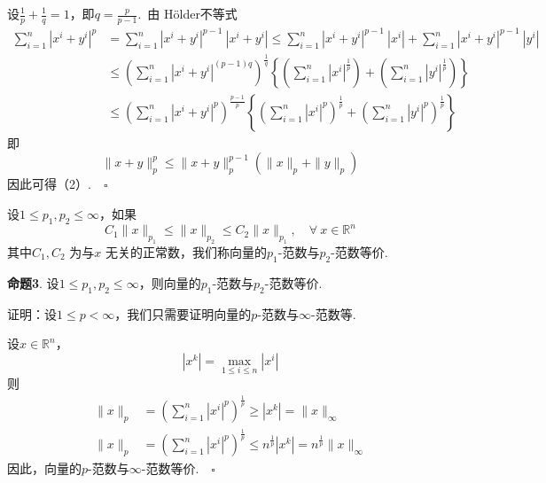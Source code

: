 \documentclass{article}
\begin{document}
\vspace{10pt}

\noindent 设\(\frac{1}{p} + \frac{1}{q} = 1\)，即\(q = \frac{p}{p - 1} \).\ 由 H\"older不等式
\begin{align*}
    \sum_{i=1}^n | x^i + y^i |^p &= \sum_{i=1}^n | x^i + y^i |^{p - 1}\ | x^i + y^i | \le \sum_{i=1}^n | x^i + y^i |^{p - 1}\ | x^i |+\sum_{i=1}^n | x^i + y^i |^{p - 1}\ | y^i | \\
    & \le \left( \sum_{i=1}^n | x^i + y^i |^{(p - 1)q} \right)^\frac{1}{q} \left\{\left(\sum_{i=1}^n | x^i |^\frac{1}{p}\right) + \left( \sum_{i=1}^n | y^i |^\frac{1}{p}   \right) \right\} \\
    & \le \left( \sum_{i=1}^n | x^i + y^i |^p  \right)^\frac{p - 1}{p}\left\{\left( \sum_{i=1}^n | x^i |^p  \right)^\frac{1}{p} + \left( \sum_{i=1}^n | y^i |^p  \right)^\frac{1}{p}   \right\}
\end{align*}
即
\begin{equation*}
    \|x + y\|_p^p \le \|x + y\|_p^{p - 1}(\|x\|_p+\|y\|_p)
\end{equation*}
因此可得（2）.\(\quad \square\)

\newpage

设\(1 \le p_1, p_2 \le \infty \)，如果
\begin{equation*}
    C_1\|x\|_{p_1} \le \|x\|_{p_2} \le C_2\|x\|_{p_1},\quad \forall \ x \in \mathbb{R}^n
\end{equation*}
其中\(C_1,C_2\) 为与\(x\) 无关的正常数，我们称向量的\(p_1\)-范数与\(p_2\)-范数等价.

\vspace{20pt}

\noindent \textbf{命题3}. 设\(1 \le p_1, p_2 \le \infty \)，则向量的\(p_1\)-范数与\(p_2\)-范数等价.
\vspace{20pt}

\noindent 证明：设\(1 \le p < \infty \)，我们只需要证明向量的\(p\)-范数与\(\infty \)-范数等.

\noindent 设\(x \in \mathbb{R}^n\)，
\begin{equation*}
    | x^k |= \max_{1 \le i \le n }| x^i |
\end{equation*}
则
\begin{align*}
    \|x\|_p &= \left( \sum_{i=1}^n | x^i |^p  \right)^\frac{1}{p} \ge | x^k |=\|x\|_{\infty } \\
    \|x\|_p &= \left( \sum_{i=1}^n | x^i |^p  \right)^\frac{1}{p}
    \le n^{\frac{1}{p} }| x^k |= n^{\frac{1}{p} }\|x\|_{\infty }
\end{align*}
因此，向量的\(p\)-范数与\(\infty \)-范数等价.\(\quad \square\)
\end{document}
